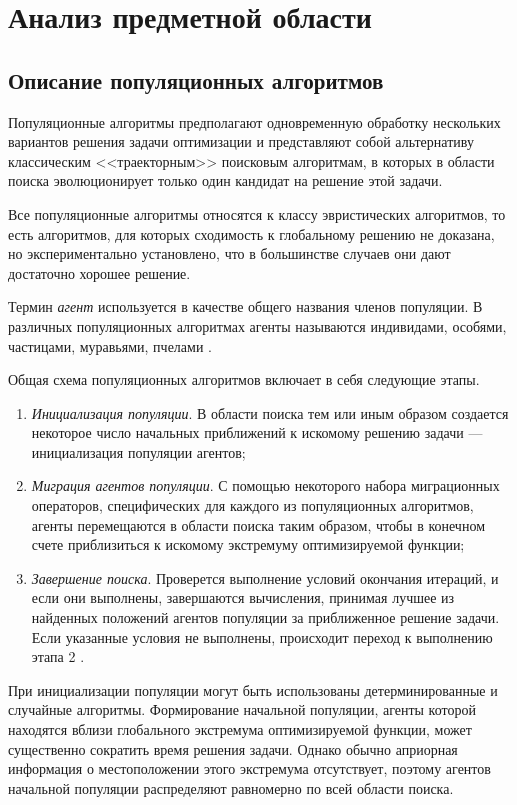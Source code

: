 \chapter{Анализ предметной области}

\section{Описание популяционных алгоритмов}
Популяционные алгоритмы предполагают одновременную обработку нескольких вариантов решения задачи оптимизации и представляют собой альтернативу классическим <<траекторным>> \cite{vodolaz} поисковым алгоритмам, в которых в области поиска эволюционирует только один кандидат на решение этой задачи.  

Все популяционные алгоритмы относятся к классу эвристических алгоритмов, то есть алгоритмов, для которых сходимость к глобальному решению не доказана, но экспериментально установлено, что в большинстве случаев они дают достаточно хорошее решение.

Термин \textit{агент} используется в качестве общего названия членов популяции.  В различных популяционных алгоритмах агенты называются индивидами, особями, частицами, муравьями, пчелами \cite{karpenko} \cite{nogin}.  

Общая схема популяционных алгоритмов включает в себя следующие этапы.
\begin{enumerate}
	\item \textit{Инициализация популяции}. В области поиска тем или иным образом создается некоторое число начальных приближений к искомому решению задачи --- инициализация популяции агентов;
	\item \textit{Миграция агентов популяции}. С помощью некоторого набора миграционных операторов, специфических для каждого из популяционных алгоритмов, агенты перемещаются в области поиска таким образом, чтобы в конечном счете приблизиться к искомому экстремуму оптимизируемой функции; 
	\item \textit{Завершение поиска}. Проверется выполнение условий окончания итераций, и если они выполнены, завершаются вычисления, принимая лучшее из найденных положений агентов популяции за приближенное решение задачи. Если указанные условия не выполнены, происходит переход к выполнению этапа 2 \cite{shtovba}.
\end{enumerate}

При инициализации популяции могут быть использованы детерминированные и случайные алгоритмы. Формирование начальной популяции, агенты которой находятся вблизи глобального экстремума оптимизируемой функции, может существенно сократить время решения задачи. Однако обычно априорная информация о местоположении этого экстремума отсутствует, поэтому агентов начальной популяции распределяют равномерно по всей области поиска.  

